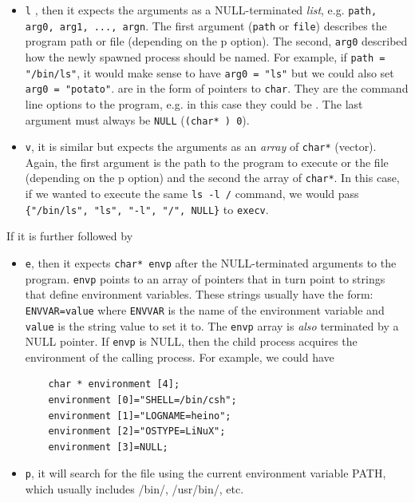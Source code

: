 \documentclass[a4paper]{article}
\begin{document}
\begin{itemize}
    \item \texttt{l} , then it expects the arguments as a NULL-terminated \textit{list}, e.g. \texttt{path, arg0, arg1, ..., argn}. The first argument (\texttt{path} or \texttt{file}) describes the program path or file (depending on the p option).  The second, \texttt{arg0} described how the newly spawned process should be named. For example, if \texttt{path = "/bin/ls"}, it would make sense to have \texttt{arg0 = "ls"} but we could also set \texttt{arg0 = "potato"}.  are in the form of pointers to \texttt{char}. They are the command line options to the program, e.g. in this case they could be . The last argument must always be \texttt{NULL} (\texttt{(char* ) 0}). 
    \item \texttt{v}, it is similar but expects the arguments as an \textit{array} of \texttt{char*} (vector). Again, the first argument is the path to the program to execute or the file (depending on the p option) and the second the array of \texttt{char*}.  In this case, if we wanted to execute the same \texttt{ls -l /} command, we would pass \texttt{\{"/bin/ls", "ls", "-l", "/", NULL\}} to \texttt{execv}.
\end{itemize}
If it is further followed by
\begin{itemize}
    \item \texttt{e}, then it expects  \texttt{char* envp} after the NULL-terminated arguments to the program. \texttt{envp} points to an array of pointers that in turn point to strings
    that define environment variables.  These strings usually have the form:  \texttt{ENVVAR=value} where \texttt{ENVVAR} is the name of the environment
    variable and \texttt{value} is the string value to set it to.  The \texttt{envp} array is \textit{also} terminated by a NULL pointer.  If \texttt{envp} is NULL, then the
    child process acquires the environment of the calling process. For example, we could have
    \begin{verbatim}
    char * environment [4];
    environment [0]="SHELL=/bin/csh";
    environment [1]="LOGNAME=heino";
    environment [2]="OSTYPE=LiNuX";
    environment [3]=NULL;
    \end{verbatim}
    \item \texttt{p}, it will search for the file using the current environment  variable PATH, which usually includes /bin/, /usr/bin/, etc.
\end{itemize}
\end{document}
